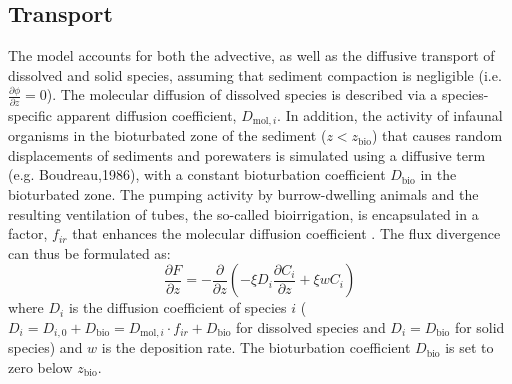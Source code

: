 \documentclass[gmd, manuscript]{copernicus}
\begin{document}
\subsection{Transport}\label{subsec:Transport}
The model accounts for both the advective, as well as the diffusive transport of dissolved and solid species, assuming that sediment compaction is negligible (i.e. $\frac{\partial \phi}{\partial z}=0$). 
The molecular diffusion of dissolved species is described via a species-specific apparent diffusion coefficient, $D_{\mathrm{mol},i}$. 
In addition, the activity of infaunal organisms in the bioturbated zone of the sediment ($z<z_{\mathrm{bio}}$) that causes random 
displacements of sediments and porewaters is simulated using a diffusive term (e.g. Boudreau,1986), with a constant bioturbation coefficient $D_{\mathrm{bio}}$ in the bioturbated zone. 
The pumping activity by burrow-dwelling animals and the resulting ventilation of tubes, the so-called bioirrigation, is encapsulated in a factor, $f_{ir}$ that enhances the molecular diffusion coefficient 
\citep[ hence, $D_{i,0}=D_{\mathrm{mol},i}\cdot f_{ir}$,][]{soetaert1996dynamic}. The flux divergence can thus be formulated as:
\begin{equation}
\frac{\partial F}{\partial z}=-\frac{\partial}{\partial z}\left( -\xi D_i \frac{\partial C_i}{\partial z} +\xi w C_i\right) \label{Eq_flux_divergence}
\end{equation}
where $D_i$ is the diffusion coefficient of species $i$ ($D_i=D_{i,0}+D_{\mathrm{bio}}=D_{\mathrm{mol},i}\cdot f_{ir}+D_{\mathrm{bio}}$ for dissolved species and $D_i=D_{\mathrm{bio}}$ for solid species) and $w$ is the 
deposition rate. The bioturbation coefficient $D_{\mathrm{bio}}$ is set to zero below $z_{\mathrm{bio}}$. 
\end{document}
